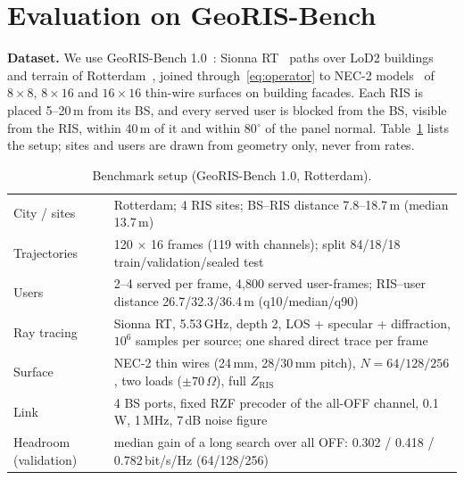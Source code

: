 \documentclass[runningheads]{llncs}
\begin{document}
\section{Evaluation on GeoRIS-Bench}\label{sec:results}
\textbf{Dataset.} We use GeoRIS-Bench 1.0~\cite{georisbench}: Sionna RT~\cite{hoydis2023sionna} paths over LoD2 buildings and terrain of Rotterdam~\cite{peters2022automated,ledoux2019cityjson,ahn4}, joined through~\eqref{eq:operator} to NEC-2 models~\cite{burke1981nec,pynec} of $8\times8$, $8\times16$ and $16\times16$ thin-wire surfaces on building facades. Each RIS is placed 5--20\,m from its BS, and every served user is blocked from the BS, visible from the RIS, within 40\,m of it and within 80$^\circ$ of the panel normal. Table~\ref{tab:setup} lists the setup; sites and users are drawn from geometry only, never from rates.

\begin{table}[t]
\centering
\caption{Benchmark setup (GeoRIS-Bench 1.0, Rotterdam).}\label{tab:setup}
\scriptsize\setlength{\tabcolsep}{4pt}
\begin{tabular}{@{}lp{}@{}}
\toprule
City / sites & Rotterdam; 4 RIS sites; BS--RIS distance 7.8--18.7\,m (median 13.7\,m)\\
Trajectories & 120 $\times$ 16 frames (119 with channels); split 84/18/18 train/validation/sealed test\\
Users & 2--4 served per frame, 4,800 served user-frames; RIS--user distance 26.7/32.3/36.4\,m (q10/median/q90)\\
Ray tracing & Sionna RT, 5.53\,GHz, depth 2, LOS + specular + diffraction, $10^{6}$ samples per source; one shared direct trace per frame\\
Surface & NEC-2 thin wires (24\,mm, 28/30\,mm pitch), $N=64/128/256$, two loads ($\pm70\,\Omega$), full $Z_{\mathrm{RIS}}$\\
Link & 4 BS ports, fixed RZF precoder of the all-OFF channel, 0.1\,W, 1\,MHz, 7\,dB noise figure\\
Headroom (validation) & median gain of a long search over all OFF: 0.302 / 0.418 / 0.782\,bit/s/Hz (64/128/256)\\
\bottomrule
\end{tabular}
\end{table}
\end{document}
